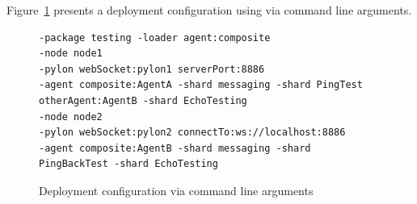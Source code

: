 \documentclass{article}
\begin{document}
Figure~\ref{fig:func:WebSocketPylon:code} presents a deployment configuration using  via command line arguments.

\begin{figure}[ht]\centering
\begin{lstlisting}
-package testing -loader agent:composite
-node node1
-pylon webSocket:pylon1 serverPort:8886
-agent composite:AgentA -shard messaging -shard PingTest otherAgent:AgentB -shard EchoTesting
-node node2
-pylon webSocket:pylon2 connectTo:ws://localhost:8886
-agent composite:AgentB -shard messaging -shard PingBackTest -shard EchoTesting
\end{lstlisting}
\caption{Deployment configuration via command line arguments}\label{fig:func:WebSocketPylon:code}
\end{figure}
\end{document}
